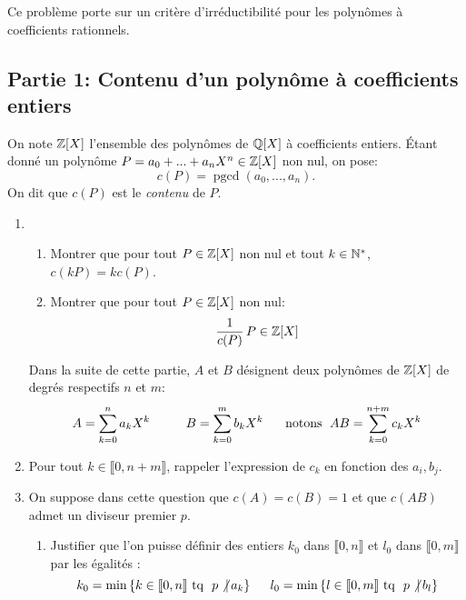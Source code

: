 
 Ce problème porte sur un critère d'irréductibilité pour les polynômes à coefficients rationnels.

\subsection*{Partie 1: Contenu d'un polynôme à coefficients entiers}

 On note $\mathbb{Z}[X]$ l'ensemble des polynômes de $\mathbb{Q}[X]$ à coefficients entiers. \'Etant donné un polynôme $P=a_{0} + ... + a_{n}X^{n}\in \mathbb{Z}[X]$ non nul, on pose:
$$c(P) = \operatorname{pgcd}(a_{0},...,a_{n}).$$
On dit que $c(P)$ est le \textit{contenu} de $P$.

\begin{enumerate}
 \item  \begin{enumerate}
            \item Montrer que pour tout $P\in \mathbb{Z}[X]$ non nul et tout $k\in \mathbb{N}^{*}$, $c(kP) = kc(P)$. 
            \item Montrer que pour tout $P\in \mathbb{Z}[X]$ non nul:
            $$\frac{1}{c(P)}\, P\in \mathbb{Z}[X]$$
           \end{enumerate}

 
Dans la suite de cette partie, $A$ et $B$ désignent deux polynômes de $\mathbb{Z}[X]$ de degrés respectifs $n$ et $m$:
\begin{displaymath}
A = \sum_{k=0}^{n}a_{k}X^{k} \hspace{1cm}  B = \sum_{k=0}^{m}b_{k}X^{k}\hspace{0.5cm}
\text{ notons }\;AB = \sum_{k=0}^{n+m}c_{k}X^{k}
\end{displaymath}

  \item  Pour tout $k\in \llbracket 0, n+m\rrbracket$, rappeler l'expression de $c_{k}$ en fonction des $a_{i},b_{j}$. 
  
  \item  On suppose dans cette question que $c(A) = c(B) = 1$ et que $c(AB)$ admet un diviseur premier $p$.
 \begin{enumerate}
  \item Justifier que l'on puisse définir des entiers $k_{0}$ dans $\llbracket 0, n\rrbracket$ et $l_{0}$ dans $\llbracket 0, m\rrbracket$ par les égalités :
\begin{displaymath}
k_{0} = \min \left\lbrace  k\in \llbracket 0, n\rrbracket \text{ tq } \ p \not | \,a_{k} \right\rbrace  \hspace{0.5cm}
l_{0} = \min \left\lbrace  l\in \llbracket 0, m\rrbracket \text{ tq } \ p \not | \, b_{l} \right\rbrace 
\end{displaymath}


\end{enumerate}
\end{enumerate}
